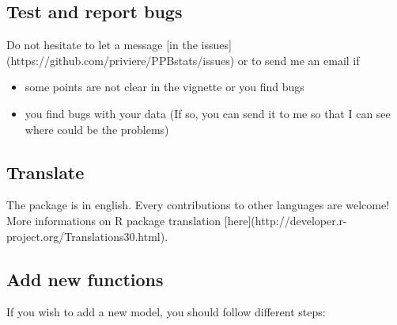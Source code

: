 \documentclass{article}\usepackage[]{graphicx}\usepackage[]{color}
\begin{document}
\subsection{Test and report bugs}

Do not hesitate to let a message [in the issues](https://github.com/priviere/PPBstats/issues) or to send me an email if
\begin{itemize}
\item some points are not clear in the vignette or you find bugs
\item you find bugs with your data (If so, you can send it to me so that I can see where could be the problems)
\end{itemize}


\subsection{Translate}

The package is in english. 
Every contributions to other languages are welcome!
More informations on R package translation [here](http://developer.r-project.org/Translations30.html).

\subsection{Add new functions}

If you wish to add a new model, you should follow different steps:
\end{document}
